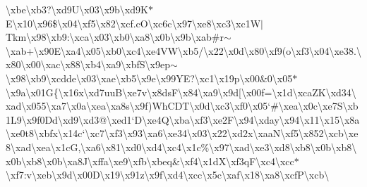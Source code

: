 \textbackslash{}xbe\textbackslash{}xb3?\textbackslash{}xd9\+U\textbackslash{}x03\textbackslash{}x9b\textbackslash{}xd9\+K$\ast$\+E\textbackslash{}x10\textbackslash{}x96\$\textbackslash{}x04\textbackslash{}xf5\textbackslash{}x82\textbackslash{}xcf.\+c\+O\textbackslash{}xc6c\textbackslash{}x97\textbackslash{}xe8\textbackslash{}xc3\textbackslash{}xc1\+W$\vert$\+Tkm\textbackslash{}x98\textbackslash{}xb9\+:\textbackslash{}xca\textbackslash{}x03\textbackslash{}xb0\textbackslash{}xa8\textbackslash{}x0b\textbackslash{}x9b\textbackslash{}xab\#r$\sim$\textbackslash{}xab+\textbackslash{}x90\+E\textbackslash{}xa4\textbackslash{}x05\textbackslash{}xb0\textbackslash{}xc4\textbackslash{}xe4\+V\+W\textbackslash{}xb5/\textbackslash{}x22\textbackslash{}x0d\textbackslash{}x80\textbackslash{}xf9(o\textbackslash{}xf3\textbackslash{}x04\textbackslash{}xe38.\textbackslash{}x80\textbackslash{}x00\textbackslash{}xac\textbackslash{}x88\textbackslash{}xb4\textbackslash{}xa9\textbackslash{}xbf\+S\textbackslash{}x9ep$\sim$\textbackslash{}x98\textbackslash{}xb9\textbackslash{}xcdde\textbackslash{}x03\textbackslash{}xae\textbackslash{}xb5\textbackslash{}x9e\textbackslash{}x99\+Y\+E?\textbackslash{}xc1\textbackslash{}x19p\textbackslash{}x00\&0\textbackslash{}x05$\ast$\textbackslash{}x9a\textbackslash{}x01\+G\{\textbackslash{}x16x\textbackslash{}xd7uu\+B\textbackslash{}xe7v\textbackslash{}x8ds\+F\textbackslash{}x84\textbackslash{}xa9\textbackslash{}x9d\mbox{[}\textbackslash{}x00f=\textbackslash{}x1d\textbackslash{}xca\+Z\+K\textbackslash{}xd34\textbackslash{}xad\textbackslash{}x055\textbackslash{}xa7\textbackslash{}x0a\textbackslash{}xea\textbackslash{}xa8s\textbackslash{}x9f)\+Wh\+C\+D\+T\textbackslash{}x0d\textbackslash{}xc3\textbackslash{}xf0\textbackslash{}x05`\#\textbackslash{}xea\textbackslash{}x0c\textbackslash{}xe7\+S\textbackslash{}xb1\+L9\textbackslash{}x9f0\+Dd\textbackslash{}xd9\textbackslash{}xd3@\textbackslash{}xed1`\+D\textbackslash{}xe4\+Q\textbackslash{}xba\textbackslash{}xf3\textbackslash{}xe2\+F\textbackslash{}x94\textbackslash{}xday\textbackslash{}x94\textbackslash{}x11\textbackslash{}x15\textbackslash{}x8a\textbackslash{}xe0t8\textbackslash{}xbfx\textbackslash{}x14c`\textbackslash{}xc7\textbackslash{}xf3\textbackslash{}x93\textbackslash{}xa6\textbackslash{}xe34\textbackslash{}x03\textbackslash{}x22\textbackslash{}xd2x\textbackslash{}xaa\+N\textbackslash{}xf5\textbackslash{}x852\textbackslash{}xcb\textbackslash{}xe8\textbackslash{}xad\textbackslash{}xea\textbackslash{}x1c\+G,\textbackslash{}xa6\textbackslash{}x81\textbackslash{}xd0\textbackslash{}xd4\textbackslash{}xc4\textbackslash{}x1c\%\textbackslash{}x97\textbackslash{}xad\textbackslash{}xe3\textbackslash{}xd8\textbackslash{}xb8\textbackslash{}x0b\textbackslash{}xb8\textbackslash{}x0b\textbackslash{}xb8\textbackslash{}x0b\textbackslash{}xa8\+J\textbackslash{}xffa\textbackslash{}xe9\textbackslash{}xfb\textbackslash{}xbeq\&\textbackslash{}xf4\textbackslash{}x1d\+X\textbackslash{}xf3q\+F\textbackslash{}xc4\textbackslash{}xcc$\ast$\textbackslash{}xf7\+:v\textbackslash{}xeb\textbackslash{}x9d\textbackslash{}x00\+D\textbackslash{}x19\textbackslash{}x91z\textbackslash{}x9f\textbackslash{}xd4\textbackslash{}xcc\textbackslash{}x5c\textbackslash{}xaf\textbackslash{}x18\textbackslash{}xa8\textbackslash{}xcf\+P\textbackslash{}xcb\textbackslash